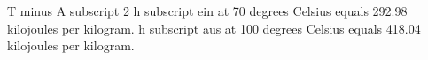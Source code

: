 T minus A subscript 2
h subscript ein at 70 degrees Celsius equals 292.98 kilojoules per kilogram.
h subscript aus at 100 degrees Celsius equals 418.04 kilojoules per kilogram.